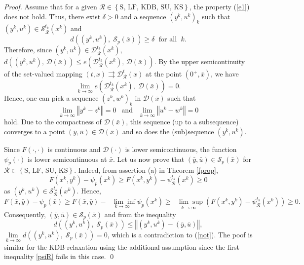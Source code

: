 \documentclass[10pt,a4paper]{amsart}
\begin{document}
\begin{proof}
Assume that for a given $\mathcal{R}\in  \left\{\text{S}, \, \text{LF}, \,\text{KDB}, \, \text{SU},\, \text{KS}\right\}$, the property (\ref{e1}) does not hold. Thus,  there exist $\delta >0$ and a sequence $(y^{k},u^{k})_{k}$ such that $(y^{k},u^{k})\in\mathcal{S}_\mathcal{R}^{t_{k}}(x^{k})$ and
\begin{equation}\label{not}
d\left((y^{k},u^{k}),\;\mathcal{S}_p(\bar{x})\right) \geq \delta \;\mbox{ for all }\; k.
\end{equation}
Therefore, since $(y^{k},u^{k})\in \mathcal{D}_\mathcal{R}^{t_{k}}(x^{k})$, 
$
d\left((y^{k},u^{k}), \,\mathcal{D}(\bar{x})\right)\leq e\left(\mathcal{D}_\mathcal{R}^{t_{k}}(x^{k}
), \,\mathcal{D}(\bar{x})\right).
$
By the upper semicontinuity of the set-valued mapping $(t,x) \rightrightarrows \mathcal{D}_\mathcal{R}^{t}(x)$ at the point $\left(0^+,\bar{x}\right)$,  we have  
\[
\underset{k \rightarrow
		\infty}{\lim }e\left(\mathcal{D}^{t_{k}}_\mathcal{R}(x^{k}), \;\mathcal{D}(\bar{x})\right)=0.
\]
Hence, one can pick a sequence  $(z^{k},w^{k})_k$ in $\mathcal{D}(\bar{x})$ such that
\[
    \underset{k \rightarrow
		\infty}{\lim }\left\Vert y^{k}-z^{k}\right\Vert = 0 \;\, \text{ and } \;\,\underset{k \rightarrow
		\infty}{\lim }\left\Vert
	u^{k}-w^{k}\right\Vert = 0
\]
hold. Due to the compactness of $\mathcal{D}(\bar{x})$, this sequence (up to a subsequence) converges to a point $(\bar{y},\bar
{u})\in\mathcal{D}(\bar{x})$ and so does the (sub)sequence $(y^{k},u^{k})$.

Since $F(\cdot,\cdot)$ is continuous and $\mathcal{D}(\cdot)$ is lower
semicontinuous, the function $\psi_{p}(\cdot)$ is lower semicontinuous at
$\bar{x}$. Let us now prove that $(\bar{y},\bar{u})\in\mathcal{S}_{p}(\bar{x})$ for $\mathcal{R}\in  \left\{\mbox{S}, \, \mbox{LF}, \, \mbox{SU},\, \mbox{KS}\right\}$. Indeed,
from assertion (a) in Theorem \ref{fprop}, 
\begin{equation} \label{psiR}
    F(x^{k},y^{k})-\psi_{p}(x^{k})\geq F(x^{k},y^{k})-\psi_\mathcal{R}^{t_{k}}
(x^{k})\geq0
\end{equation}
as $(y^{k},u^{k})\in\mathcal{S}_\mathcal{R}^{t_{k}}(x^{k})$.  Hence,
\[
F(\bar{x},\bar{y})-\psi_{p}(\bar{x})\geq F(\bar{x},\bar{y})-\underset
{k\rightarrow\infty}{\text{ }\lim\inf}\psi_{p}(x^{k})\geq \underset
{k\rightarrow\infty}{\text{ }\lim\sup}(F(x^{k},y^{k})-\psi_\mathcal{R}^{t_{k}}(x^{k}
))\geq0.
\]
Consequently, $(\bar{y},\bar{u})\in\mathcal{S}_{p}(\bar{x})$ and from the inequality
\[
d\left((y^{k},u^{k}), \;\mathcal{S}_{p}(\bar{x})\right)\leq\left\Vert (y^{k},u^{k})-(\bar
{y},\bar{u})\right\Vert,
\]
$\underset{k\longrightarrow\infty}{\lim}d\left(\left(y^{k},u^{k}\right), \;\mathcal{S}_{p}
(\bar{x})\right)=0$, which is a contradiction to (\ref{not}).  The  poof  is similar for the KDB-relaxation using the additional assumption since the first inequality  \eqref{psiR} fails in this case. \hfill \qed
\end{proof}
\end{document}
